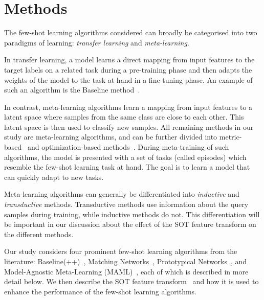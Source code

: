 \section{Methods}

The few-shot learning algorithms considered can broadly be categorised into two paradigms of learning: \textit{transfer learning} and \textit{meta-learning}.
 
In transfer learning, a model learns a direct mapping from input features to the target labels on a related task during a pre-training phase and then adapts the weights of the model to the task at hand in a fine-tuning phase. An example of such an algorithm is the Baseline method~\cite{baseline}.

In contrast, meta-learning algorithms learn a mapping from input features to a latent space where samples from the same class are close to each other. This latent space is then used to classify new samples. All remaining methods in our study are meta-learning algorithms, and can be further divided into metric-based~\cite{matchingnet, protonet} and optimization-based methods~\cite{maml}. During meta-training of such algorithms, the model is presented with a set of tasks (called episodes) which resemble the few-shot learning task at hand. The goal is to learn a model that can quickly adapt to new tasks. 

Meta-learning algorithms can generally be differentiated into \textit{inductive} and \textit{transductive} methods. Transductive methods use information about the query samples during training, while inductive methods do not. This differentiation will be important in our discussion about the effect of the SOT feature transform on the different methods.

Our study considers four prominent few-shot learning algorithms from the literature: Baseline(++)~\cite{baseline}, Matching Networks~\cite{matchingnet}, Prototypical Networks~\cite{protonet}, and Model-Agnostic Meta-Learning (MAML)~\cite{maml}, each of which is described in more detail below. We then describe the SOT feature transform~\cite{sot} and how it is used to enhance the performance of the few-shot learning algorithms.



